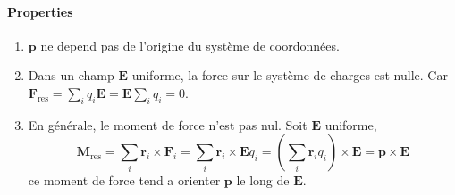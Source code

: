 \paragraph{Properties}
\begin{enumerate}
\item $\boldsymbol{p}$ ne depend pas de l'origine du système de coordonnées. 
\item Dans un champ $\boldsymbol{E}$ uniforme, la force sur le système de charges est nulle. Car $\boldsymbol{F}_{\mathrm{res}}=\sum _{i}q_{i}\boldsymbol{E}=\boldsymbol{E}\sum _{i}q_{i}=0$.
\item En générale, le moment de force n'est pas nul. Soit $\boldsymbol{E}$ uniforme, 
$$
\boldsymbol{M}_{\mathrm{res}}=\sum _{i}\boldsymbol{r}_{i}\times \boldsymbol{F}_{i}=\sum _{i}\boldsymbol{r}_{i}\times \boldsymbol{E}q_{i}=\left( \sum _{i}\boldsymbol{r}_{i}q_{i} \right)\times \boldsymbol{E}=\boldsymbol{p}\times \boldsymbol{E}
$$
ce moment de force tend a orienter $\boldsymbol{p}$ le long de $\boldsymbol{E}$.
\end{enumerate}



